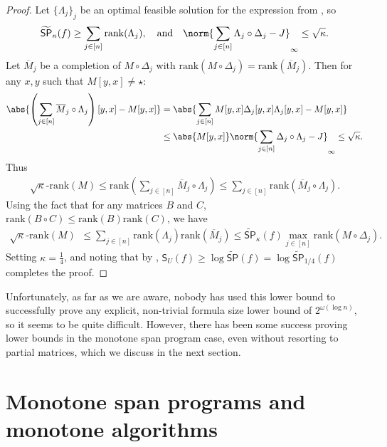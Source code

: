 \documentclass{toc}
\begin{document}
\begin{proof}
Let $\{\Lambda_j\}_j$ be an optimal feasible solution for the expression from , so 
$$\widetilde{\mathsf{SP}}_{\kappa}(f)\geq \sum_{j\in [n]}\mathrm{rank}(\Lambda_j),\quad\mbox{and}\quad 
\norm{\sum_{j\in[n]}\Lambda_j\circ\Delta_j - J}_\infty\leq \sqrt\kappa.$$
Let $\overline{M}_j$ be a completion of $M\circ\Delta_j$ with $\mbox{rank}(M\circ\Delta_j)=\mbox{rank}(\overline{M}_j)$. Then for any $x,y$ such that $M[y,x]\neq \star$:
\begin{align*}
\abs{\left(\sum_{j\in [n]}\overline{M}_j\circ\Lambda_j\right)[y,x]-M[y,x]} &= \abs{\sum_{j\in[n]}M[y,x]\Delta_j[y,x]\Lambda_j[y,x]-M[y,x]}\\
&\leq \abs{M[y,x]}\norm{\sum_{j\in [n]}\Delta_j\circ\Lambda_j-J}_\infty\leq \sqrt{\kappa}.
\end{align*}
Thus
\begin{align*}
\sqrt{\kappa}\mbox{-rank}(M) \leq \mbox{rank}\left(\sum_{j\in [n]}\overline{M}_j\circ\Lambda_j\right)\leq \sum_{j\in [n]}\mathrm{rank}(\overline{M}_j\circ\Lambda_j).
\end{align*}
Using the fact that for any matrices $B$ and $C$, $\mathrm{rank}(B\circ C)\leq \mathrm{rank}(B)\mathrm{rank}(C)$, we have 
\begin{align*}
\sqrt{\kappa}\mbox{-rank}(M)&\leq \sum_{j\in[n]}\mathrm{rank}(\Lambda_j)\mathrm{rank}(\overline{M}_j)
\leq  \widetilde{\mathsf{SP}}_\kappa(f)\max_{j\in [n]}\mathrm{rank}(M\circ\Delta_j).
\end{align*}
Setting $\kappa=\frac{1}{4}$, and noting that by , $\mathsf{S}_U(f)\geq \log\widetilde{\mathsf{SP}}(f)=\log\widetilde{\mathsf{SP}}_{1/4}(f)$ completes the proof.
\end{proof}



Unfortunately, as far as we are aware, nobody has used this lower bound to successfully prove any explicit, non-trivial formula size lower bound of $2^{\omega(\log n)}$, so it seems to be quite difficult. However, there has been some success proving lower bounds in the monotone span program case, even without resorting to partial matrices, which we discuss in the next section. 

\section{Monotone span programs and monotone algorithms}\label{sec:monotone}
\end{document}
